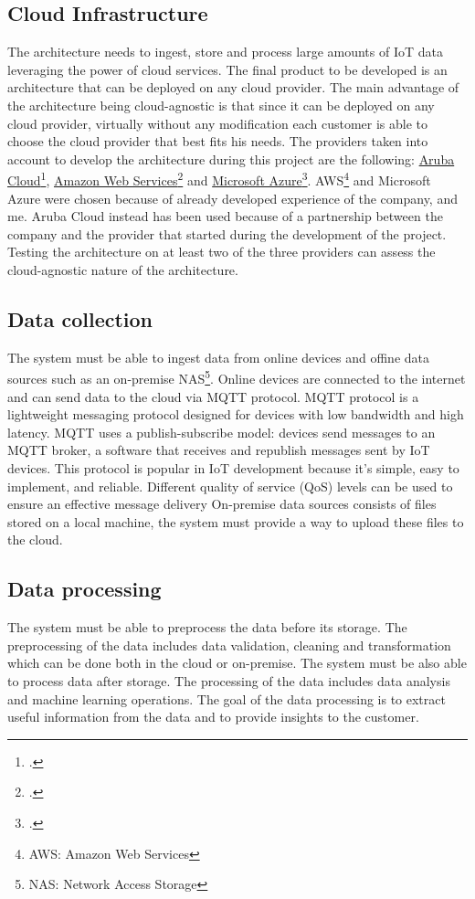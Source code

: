 \subsection{Cloud Infrastructure}
The architecture needs to ingest, store and process large amounts of IoT data leveraging the power of cloud services. The final product to be developed is an architecture that can be deployed on any cloud provider. The main advantage of the architecture being cloud-agnostic is that since it can be deployed on any cloud provider, virtually without any modification each customer is able to choose the cloud provider that best fits his needs.
The providers taken into account to develop the architecture during this project are the following: \href{https://www.arubacloud.com/}{Aruba Cloud}\footcite{site:aruba-cloud}, \href{https://aws.amazon.com/it/}{Amazon Web Services}\footcite{site:aws} and \href{https://azure.microsoft.com/it-it/}{Microsoft Azure}\footcite{site:azure}. 
AWS\footnote{AWS: Amazon Web Services} and Microsoft Azure were chosen because of already developed experience of the company, and me. Aruba Cloud instead has been used because of a partnership between the company and the provider that started during the development of the project. Testing the architecture on at least two of the three providers can assess the cloud-agnostic nature of the architecture.\\


\subsection{Data collection}
The system must be able to ingest data from online devices and offine data sources such as an on-premise NAS\footnote{NAS: Network Access Storage}. 
Online devices are connected to the internet and can send data to the cloud via MQTT protocol.
MQTT protocol is a lightweight messaging protocol designed for devices with low bandwidth and high latency. MQTT uses a publish-subscribe model: devices send messages to an MQTT broker, a software that receives and republish messages sent by IoT devices. This protocol is popular in IoT development because it's simple, easy to implement, and reliable. Different quality of service (QoS) levels can be used to ensure an effective message delivery
On-premise data sources consists of files stored on a local machine, the system must provide a way to upload these files to the cloud.
\subsection{Data processing}
The system must be able to preprocess the data before its storage. The preprocessing of the data includes data validation, cleaning and transformation which can be done both in the cloud or on-premise. The system must be also able to process data after storage. The processing of the data includes data analysis and machine learning operations. The goal of the data processing is to extract useful information from the data and to provide insights to the customer.\\ 

